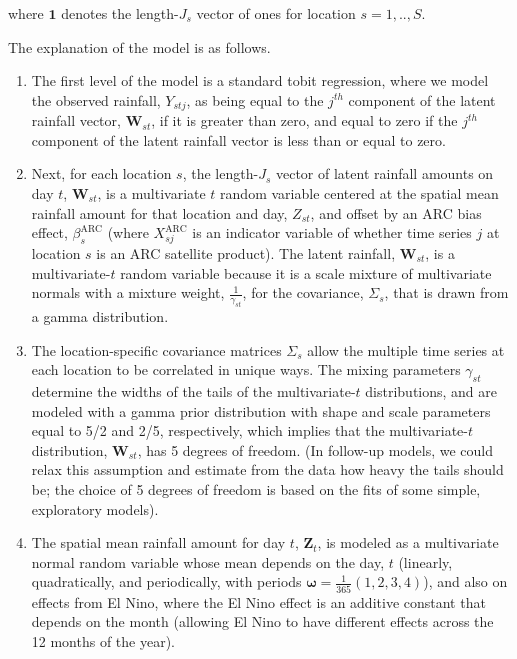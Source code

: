 \documentclass[12pt]{article}
\def\bomega{\pmb{\omega}}
\def\bZ{\pmb{Z}}
\def\bW{\pmb{W}}
\begin{document}

where $\mathbf{1}$ denotes the length-$J_s$ vector of ones for location $s = 1, .., S$.

The explanation of the model is as follows.
\begin{enumerate}
\item The first level of the model is a standard tobit regression, where we model the observed rainfall, $Y_{stj}$, as being equal to the $j^{th}$ component of the latent rainfall vector, $\bW_{st}$, if it is greater than zero, and equal to zero if the $j^{th}$ component of the latent rainfall vector is less than or equal to zero.
\item Next, for each location $s$, the length-$J_s$ vector of latent rainfall amounts on day $t$, $\bW_{st}$, is a multivariate $t$ random variable centered at the spatial mean rainfall amount for that location and day, $Z_{st}$, and offset by an ARC bias effect, $\beta_s^\text{ARC}$ (where $X^\text{ARC}_{sj}$ is an indicator variable of whether time series $j$ at location $s$ is an ARC satellite product). The latent rainfall, $\bW_{st}$, is a multivariate-$t$ random variable because it is a scale mixture of multivariate normals with a mixture weight, $\frac{1}{\gamma_{st}}$, for the covariance, $\Sigma_s$, that is drawn from a gamma distribution.
\item The location-specific covariance matrices $\Sigma_s$ allow the multiple time series at each location to be correlated in unique ways. The mixing parameters $\gamma_{st}$ determine the widths of the tails of the multivariate-$t$ distributions, and are modeled with a gamma prior distribution with shape and scale parameters equal to 5/2 and 2/5, respectively, which implies that the multivariate-$t$ distribution, $\bW_{st}$, has 5 degrees of freedom. (In follow-up models, we could relax this assumption and estimate from the data how heavy the tails should be; the choice of 5 degrees of freedom is based on the fits of some simple, exploratory models).
\item The spatial mean rainfall amount for day $t$, $\bZ_t$, is modeled as a multivariate normal random variable whose mean depends on the day, $t$ (linearly, quadratically, and periodically, with periods $\bomega = \frac{1}{365}(1, 2, 3, 4)$), and also on effects from El Nino, where the El Nino effect is an additive constant that depends on the month (allowing El Nino to have different effects across the 12 months of the year).

\end{enumerate}
\end{document}
